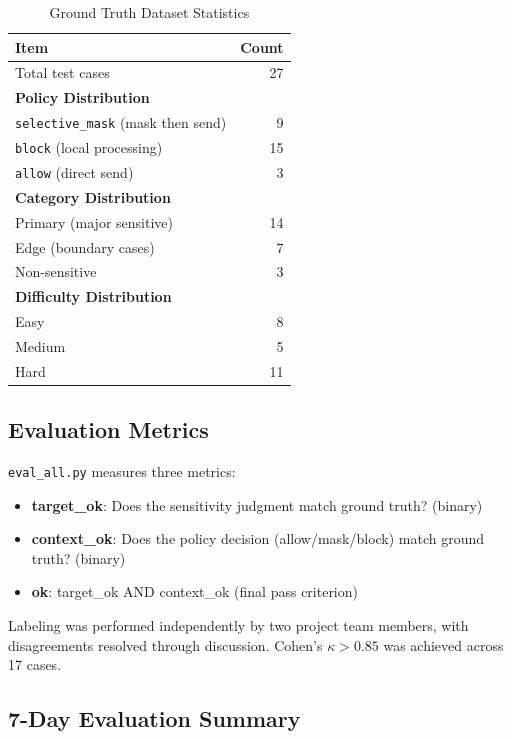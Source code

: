 \documentclass[11pt,a4paper]{article}
\begin{document}
\begin{table}[h]
\centering
\begin{tabular}{@{}lr@{}}
\toprule
Item & Count \\
\midrule
Total test cases & 27 \\
\midrule
\multicolumn{2}{l}{\textbf{Policy Distribution}} \\
\quad \texttt{selective\_mask} (mask then send) & 9 \\
\quad \texttt{block} (local processing) & 15 \\
\quad \texttt{allow} (direct send) & 3 \\
\midrule
\multicolumn{2}{l}{\textbf{Category Distribution}} \\
\quad Primary (major sensitive) & 14 \\
\quad Edge (boundary cases) & 7 \\
\quad Non-sensitive & 3 \\
\midrule
\multicolumn{2}{l}{\textbf{Difficulty Distribution}} \\
\quad Easy & 8 \\
\quad Medium & 5 \\
\quad Hard & 11 \\
\bottomrule
\end{tabular}
\caption{Ground Truth Dataset Statistics}
\end{table}

\subsection{Evaluation Metrics}

\texttt{eval\_all.py} measures three metrics:

\begin{itemize}[nosep]
  \item \textbf{target\_ok}: Does the sensitivity judgment match ground truth? (binary)
  \item \textbf{context\_ok}: Does the policy decision (allow/mask/block) match ground truth? (binary)
  \item \textbf{ok}: target\_ok AND context\_ok (final pass criterion)
\end{itemize}

Labeling was performed independently by two project team members, with disagreements resolved through discussion. Cohen's $\kappa > 0.85$ was achieved across 17 cases.

\subsection{7-Day Evaluation Summary}
\end{document}
